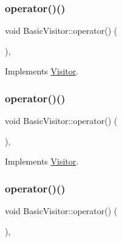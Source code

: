 \subsubsection{\texorpdfstring{operator()()}{operator()()}\hspace{0.1cm}{\footnotesize\ttfamily [4/59]}}
{\footnotesize\ttfamily void Basic\+Visitor\+::operator() (\begin{DoxyParamCaption}\item[{const \hyperlink{struct_boolean_literal}{Boolean\+Literal} \&}]{ }\end{DoxyParamCaption})\hspace{0.3cm}{\ttfamily [inline]}, {\ttfamily [virtual]}}



Implements \hyperlink{struct_visitor_af3b394eaf1b9b1db22379aedcb234a2f}{Visitor}.

\mbox{\label{struct_basic_visitor_a15a06a03234489bef8e938b3c12bc9ed}} 
\subsubsection{\texorpdfstring{operator()()}{operator()()}\hspace{0.1cm}{\footnotesize\ttfamily [5/59]}}
{\footnotesize\ttfamily void Basic\+Visitor\+::operator() (\begin{DoxyParamCaption}\item[{const \hyperlink{struct_numeric_literal}{Numeric\+Literal} \&}]{ }\end{DoxyParamCaption})\hspace{0.3cm}{\ttfamily [inline]}, {\ttfamily [virtual]}}



Implements \hyperlink{struct_visitor_a6d707fe0c1563b39aae3ecd7ddb5ab8f}{Visitor}.

\mbox{\label{struct_basic_visitor_a01233533d2401acfe3f2f93cb2e3a051}} 
\subsubsection{\texorpdfstring{operator()()}{operator()()}\hspace{0.1cm}{\footnotesize\ttfamily [6/59]}}
{\footnotesize\ttfamily void Basic\+Visitor\+::operator() (\begin{DoxyParamCaption}\item[{const \hyperlink{struct_string_literal}{String\+Literal} \&}]{ }\end{DoxyParamCaption})\hspace{0.3cm}{\ttfamily [inline]}, {\ttfamily [virtual]}}



